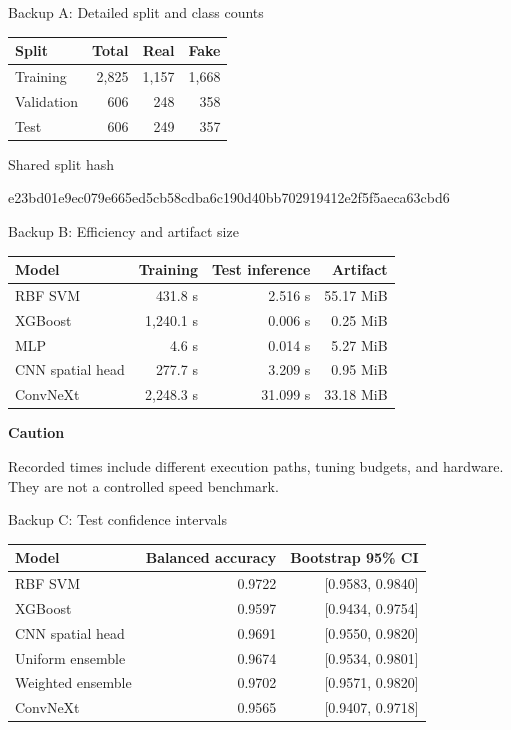 \documentclass[11pt,aspectratio=169,t]{beamer}
\begin{document}
\begin{frame}[noframenumbering]{Backup A: Detailed split and class counts}
  \centering
  \begin{tabular}{@{}lrrr@{}}
    \toprule
    \textbf{Split} & \textbf{Total} & \textbf{Real} & \textbf{Fake}\\
    \midrule
    Training & 2,825 & 1,157 & 1,668\\
    Validation & 606 & 248 & 358\\
    Test & 606 & 249 & 357\\
    \bottomrule
  \end{tabular}\par
  \vspace{0.8cm}
  {\small\color{Muted}Shared split hash}\par
  {\ttfamily\scriptsize e23bd01e9ec079e665ed5cb58cdba6c190d40bb702919412e2f5f5aeca63cbd6}
\end{frame}

\begin{frame}[noframenumbering]{Backup B: Efficiency and artifact size}
  \centering
  \small
  \begin{tabular}{@{}lrrr@{}}
    \toprule
    \textbf{Model} & \textbf{Training} & \textbf{Test inference} & \textbf{Artifact}\\
    \midrule
    RBF SVM & 431.8 s & 2.516 s & 55.17 MiB\\
    XGBoost & 1,240.1 s & 0.006 s & 0.25 MiB\\
    MLP & 4.6 s & 0.014 s & 5.27 MiB\\
    CNN spatial head & 277.7 s & 3.209 s & 0.95 MiB\\
    ConvNeXt & 2,248.3 s & 31.099 s & 33.18 MiB\\
    \bottomrule
  \end{tabular}\par
  \vspace{0.65cm}
  {\color{Orange}\bfseries Caution}\par
  Recorded times include different execution paths, tuning budgets, and hardware. They are not a controlled speed benchmark.
\end{frame}

\begin{frame}[noframenumbering]{Backup C: Test confidence intervals}
  \centering
  \small
  \begin{tabular}{@{}lrr@{}}
    \toprule
    \textbf{Model} & \textbf{Balanced accuracy} & \textbf{Bootstrap 95\% CI}\\
    \midrule
    RBF SVM & 0.9722 & [0.9583, 0.9840]\\
    XGBoost & 0.9597 & [0.9434, 0.9754]\\
    CNN spatial head & 0.9691 & [0.9550, 0.9820]\\
    Uniform ensemble & 0.9674 & [0.9534, 0.9801]\\
    Weighted ensemble & 0.9702 & [0.9571, 0.9820]\\
    ConvNeXt & 0.9565 & [0.9407, 0.9718]\\
    \bottomrule
  \end{tabular}
\end{frame}
\end{document}
